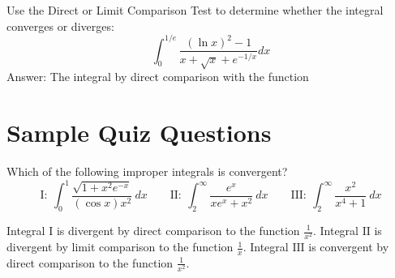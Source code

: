 \documentclass{ximera}
\begin{document}
\begin{exercise}
Use the Direct or Limit Comparison Test to determine whether the integral converges or diverges:
\[ \int_0^{1/e} \frac{(\ln x)^2-1}{x + \sqrt{x} + e^{-1/x}} dx \]
Answer: The integral  by direct comparison with the function 
\begin{multipleChoice}
\end{multipleChoice}
\end{exercise}




\section*{Sample Quiz Questions}

\begin{question}%

Which of the following improper integrals is convergent? 
\[ \mathrm{I}: \ \int_0^1\frac{\sqrt{{1}+{x^2}{e^{-x}}}}{{(\cos x)}{x^2}}~dx \qquad   \mathrm{II}: \ \int_{2}^\infty\frac{{e^{x}}}{{x}{e^{x}}+{x^2}}~dx \qquad  \mathrm{III}: \ \int_{2}^\infty\frac{{x^2}}{{x^4}+{1}}~dx\]
\begin{multiplechoice}
\end{multiplechoice}
\begin{feedback}
Integral \(\mathrm{I}\) is divergent by direct comparison to the function \(\displaystyle \frac{{1}}{{x^2}}\). 
Integral \(\mathrm{II}\) is divergent by limit comparison to the function \(\displaystyle \frac{{1}}{{x}}\). 
Integral \(\mathrm{III}\) is convergent by direct comparison to the function \(\displaystyle \frac{{1}}{{x^2}}\).
\end{feedback}

\end{question}
\end{document}
